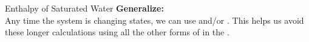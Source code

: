 \begin{example}{Enthalpy of Saturated Water}
  \textbf{Generalize:} \\
  Any time the system is changing states, we can use  and/or .
  This helps us avoid these longer calculations using all the other forms of  in the .
\end{example}


